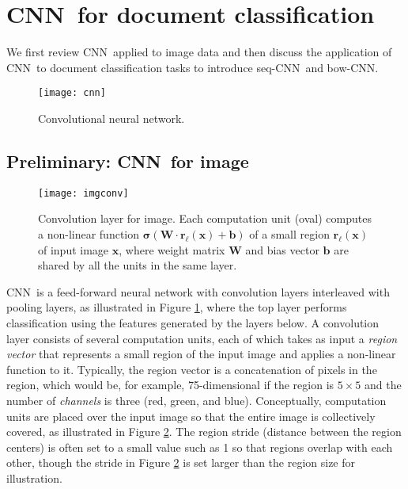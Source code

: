 \documentclass[11pt,letterpaper]{article}
\newcommand{\cnn}{CNN}
\newcommand{\scnn}{seq-CNN}
\newcommand{\bcnn}{bow-CNN}
\newcommand{\bx}{{\mathbf x}}
\newcommand{\Activ}{\boldsymbol{\sigma}}
\newcommand{\Wei}{{\mathbf W}}
\newcommand{\Bias}{{\mathbf b}}
\newcommand{\region}{{\mathbf r}} \newcommand{\iL}{\ell} \newcommand{\nL}{L}
\begin{document}
\section{\cnn\ for document classification}
\label{sec:method}
 
We first review \cnn\ applied to image data and then 
discuss the application of \cnn\ to document classification tasks 
to introduce \scnn\ and \bcnn.  

\begin{figure}
\centering
\texttt{[image: cnn]}
\vspace{-0.1in}
\caption{\label{fig:cnn} \small
Convolutional neural network.  }
\end{figure}


\subsection{Preliminary: \cnn\ for image}
\label{sec:cnn-image}

\begin{figure}
\centering
\texttt{[image: imgconv]}
\vspace{-0.1in}
\caption{\label{fig:imgconv} \footnotesize Convolution layer for image.  
Each computation unit (oval) computes a non-linear function 
$\Activ( \Wei \cdot \region_\iL(\bx) + \Bias )$ of a small region $\region_\iL(\bx)$ of input image $\bx$, 
where weight matrix $\Wei$ and bias vector $\Bias$ are shared by all the units in the same layer.
}
\end{figure}


\cnn\ is a feed-forward neural network with convolution layers interleaved with  
pooling layers, as illustrated in Figure \ref{fig:cnn}, where 
the top layer performs classification using the features generated by the 
layers below. A convolution layer consists of several computation units, each of which 
takes as input a {\em region vector} that represents a small region of the input image 
and applies a non-linear function to it.  
Typically, the region vector is a concatenation of pixels in the region, which 
would be, for example, 75-dimensional if the region is $5 \times 5$ and the number of {\em channels} 
is three (red, green, and blue).  
Conceptually, computation units are placed over the input image so that the entire image is 
collectively covered, as illustrated in Figure \ref{fig:imgconv}.  
The region stride (distance between the region centers) is often set to a small value such as 1 
so that regions overlap with each other, 
though the stride in Figure \ref{fig:imgconv} is set larger than the region size for illustration.  
\end{document}
